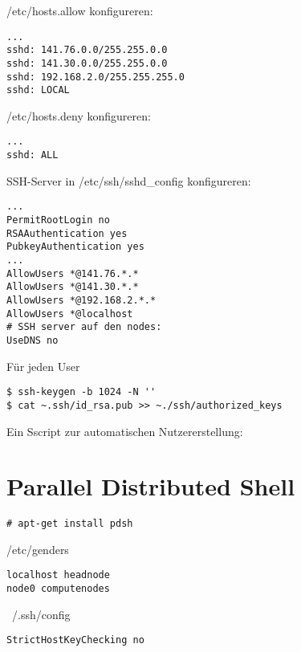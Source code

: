 /etc/hosts.allow konfigureren:
\begin{lstlisting}[style=Bash]
...
sshd: 141.76.0.0/255.255.0.0
sshd: 141.30.0.0/255.255.0.0
sshd: 192.168.2.0/255.255.255.0
sshd: LOCAL 
\end{lstlisting}
/etc/hosts.deny konfigureren:
\begin{lstlisting}[style=Bash]
...
sshd: ALL
\end{lstlisting}

SSH-Server in /etc/ssh/sshd\_config konfigureren:
\begin{lstlisting}[style=Bash]
...
PermitRootLogin no
RSAAuthentication yes
PubkeyAuthentication yes
...
AllowUsers *@141.76.*.*
AllowUsers *@141.30.*.*
AllowUsers *@192.168.2.*.*
AllowUsers *@localhost
# SSH server auf den nodes:
UseDNS no
\end{lstlisting}

Für jeden User
\begin{lstlisting}[style=Bash]
$ ssh-keygen -b 1024 -N ''
$ cat ~.ssh/id_rsa.pub >> ~./ssh/authorized_keys
\end{lstlisting}

Ein Sscript zur automatischen Nutzererstellung:


\section{Parallel Distributed Shell}
\begin{lstlisting}[style=Bash]
# apt-get install pdsh
\end{lstlisting}
/etc/genders
\begin{lstlisting}[style=Bash]
localhost headnode
node0 computenodes
\end{lstlisting}
~/.ssh/config
\begin{lstlisting}[style=Bash]
StrictHostKeyChecking no
\end{lstlisting}

